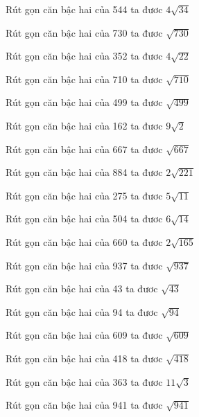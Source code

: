 \documentclass[12pt,a4paper]{article}
\begin{document}
\begin{ex}
Rút gọn căn bậc hai của 544 ta đươc $4\sqrt{34}$
\end{ex}
\begin{ex}
Rút gọn căn bậc hai của 730 ta đươc $\sqrt{730}$
\end{ex}
\begin{ex}
Rút gọn căn bậc hai của 352 ta đươc $4\sqrt{22}$
\end{ex}
\begin{ex}
Rút gọn căn bậc hai của 710 ta đươc $\sqrt{710}$
\end{ex}
\begin{ex}
Rút gọn căn bậc hai của 499 ta đươc $\sqrt{499}$
\end{ex}
\begin{ex}
Rút gọn căn bậc hai của 162 ta đươc $9\sqrt{2}$
\end{ex}
\begin{ex}
Rút gọn căn bậc hai của 667 ta đươc $\sqrt{667}$
\end{ex}
\begin{ex}
Rút gọn căn bậc hai của 884 ta đươc $2\sqrt{221}$
\end{ex}
\begin{ex}
Rút gọn căn bậc hai của 275 ta đươc $5\sqrt{11}$
\end{ex}
\begin{ex}
Rút gọn căn bậc hai của 504 ta đươc $6\sqrt{14}$
\end{ex}
\begin{ex}
Rút gọn căn bậc hai của 660 ta đươc $2\sqrt{165}$
\end{ex}
\begin{ex}
Rút gọn căn bậc hai của 937 ta đươc $\sqrt{937}$
\end{ex}
\begin{ex}
Rút gọn căn bậc hai của 43 ta đươc $\sqrt{43}$
\end{ex}
\begin{ex}
Rút gọn căn bậc hai của 94 ta đươc $\sqrt{94}$
\end{ex}
\begin{ex}
Rút gọn căn bậc hai của 609 ta đươc $\sqrt{609}$
\end{ex}
\begin{ex}
Rút gọn căn bậc hai của 418 ta đươc $\sqrt{418}$
\end{ex}
\begin{ex}
Rút gọn căn bậc hai của 363 ta đươc $11\sqrt{3}$
\end{ex}
\begin{ex}
Rút gọn căn bậc hai của 941 ta đươc $\sqrt{941}$
\end{ex}
\end{document}
